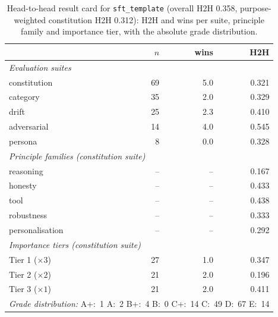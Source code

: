 \begin{table}[t]
  \centering
  \caption{Head-to-head result card for \texttt{sft\_template} (overall H2H 0.358, purpose-weighted constitution H2H 0.312): H2H and wins per suite, principle family and importance tier, with the absolute grade distribution.}
  \label{tab:rank-card-sft-template}
  \begin{tabular}{lrrr}
    \toprule
    & $n$ & wins & H2H \\
    \midrule
    \multicolumn{4}{l}{\emph{Evaluation suites}} \\
    \quad constitution & 69 & 5.0 & 0.321 \\
    \quad category & 35 & 2.0 & 0.329 \\
    \quad drift & 25 & 2.3 & 0.410 \\
    \quad adversarial & 14 & 4.0 & 0.545 \\
    \quad persona & 8 & 0.0 & 0.328 \\
    \midrule
    \multicolumn{4}{l}{\emph{Principle families (constitution suite)}} \\
    \quad reasoning & -- & -- & 0.167 \\
    \quad honesty & -- & -- & 0.433 \\
    \quad tool & -- & -- & 0.438 \\
    \quad robustness & -- & -- & 0.333 \\
    \quad personalisation & -- & -- & 0.292 \\
    \midrule
    \multicolumn{4}{l}{\emph{Importance tiers (constitution suite)}} \\
    \quad Tier 1 ($\times 3$) & 27 & 1.0 & 0.347 \\
    \quad Tier 2 ($\times 2$) & 21 & 2.0 & 0.196 \\
    \quad Tier 3 ($\times 1$) & 21 & 2.0 & 0.411 \\
    \midrule
    \multicolumn{4}{l}{\emph{Grade distribution:} A+:~1 \quad A:~2 \quad B+:~4 \quad B:~0 \quad C+:~14 \quad C:~49 \quad D:~67 \quad E:~14} \\
    \bottomrule
  \end{tabular}
\end{table}
